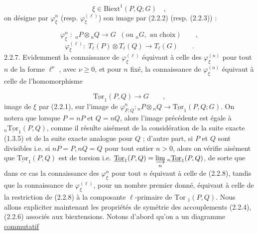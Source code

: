 \begin{equation}\tag{2.2.4}
\xi \in \mathrm{Biext}^1(P,Q;G) \quad ,
\end{equation}
on désigne par $\varphi_\xi^n$ (resp. $\varphi_\xi^{(\ell)}$) son image par (2.2.2) (resp. (2.2.3)) :

\begin{equation}\tag{2.2.5}
\varphi_\xi^n \; : \; {}_nP \otimes {}_nQ \longrightarrow G \;\; (\text{ou } {}_nG, \text{ au choix}) \qquad ,
\end{equation}
\begin{equation}\tag{2.2.6}
\varphi_\xi^{(\ell)} : \; T_\ell(P) \otimes T_\ell(Q) \longrightarrow T_\ell(G) \qquad .
\end{equation}
2.2.7.  Evidemment la connaissance de $\varphi_\xi^{(\ell)}$ équivaut à celle des $\varphi_\xi^{(n)}$ pour tout $n$ de la forme $\ell^\nu$ , avec $\nu \geq 0$, et pour $n$ fixé, la connaissance de $\varphi_\xi^{(n)}$ équivaut à celle de l'homomorphisme

\begin{equation}\tag{2.2.8}
\underline{\mathrm{Tor}}_1(P,Q) \longrightarrow G \qquad ,
\end{equation}
image de $\xi$ par (2.2.1), sur l'image de $\varphi^n_{P,Q} : {}_nP \otimes {}_nQ \longrightarrow \underline{\mathrm{Tor}}_1(P,Q;G)$. On notera que lorsque $P=nP$ et $Q=nQ$, alors l'image précédente est égale à ${}_n\underline{\mathrm{Tor}}_1(P,Q)$, comme il résulte aisément de la considération de la suite exacte (1.3.5) et de la suite exacte analogue pour $Q$ ; d'autre part, si $P$ et $Q$ sont divisibles i.e. si $nP=P,nQ=Q$ pour tout entier $n > 0$, alors on vérifie aisément que $\underline{\mathrm{Tor}}_1(P,Q)$ est de torsion i.e. $\underline{\mathrm{Tor}}_1(P,Q) = \underset{n}{\varinjlim}\; {}_n\underline{\mathrm{Tor}}_1(P,Q)$, de sorte que dans ce cas la connaissance des $\varphi_\xi^n$ pour tout $n$ équivaut à celle de (2.2.8), tandis que la connaissance de $\varphi_\xi^{(\ell)}$, pour un nombre premier donné, équivaut à celle de la restriction de (2.2.8) à la composante $\ell$-primaire de $\mathrm{Tor}\; {}_1(P,Q)$. Nous allons expliciter maintenant les propriétés de symétrie des accouplements (2.2.4), (2.2.6) associés aux biextensions. Notons d'abord qu'on a un diagramme \underline{commutatif}

